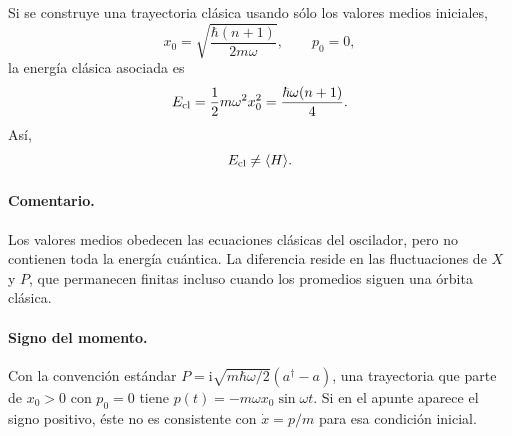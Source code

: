 \documentclass[11pt,a4paper]{article}
\numberwithin{equation}{section}
\renewcommand{\boxed}[1]{#1}
\newcommand{\ii}{\mathrm i}
\newcommand{\hb}{\hbar}
\begin{document}
Si se construye una trayectoria clásica usando sólo los valores medios iniciales,
\begin{equation}
x_0=\sqrt{\frac{\hb(n+1)}{2m\omega}},\qquad p_0=0,
\end{equation}
la energía clásica asociada es
\begin{equation}
E_{\rm cl}=\frac12m\omega^2x_0^2
=\frac{\hb\omega(n+1)}{4}.
\end{equation}
Así,
\begin{equation}
\boxed{E_{\rm cl}\neq\langle H\rangle.}
\end{equation}

\paragraph{Comentario.}
Los valores medios obedecen las ecuaciones clásicas del oscilador, pero no contienen toda la energía cuántica. La diferencia reside en las fluctuaciones de $X$ y $P$, que permanecen finitas incluso cuando los promedios siguen una órbita clásica.


\paragraph{Signo del momento.}
Con la convención estándar $P=\ii\sqrt{m\hb\omega/2}(a^\dagger-a)$, una trayectoria que parte de $x_0>0$ con $p_0=0$ tiene $p(t)=-m\omega x_0\sin\omega t$. Si en el apunte aparece el signo positivo, éste no es consistente con $\dot x=p/m$ para esa condición inicial.
\end{document}
